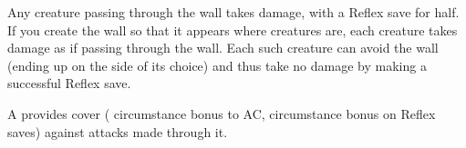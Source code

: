 \spellrng{\rngmed}
\begin{spelleffect}
  Any creature passing through the wall takes damage, with a Reflex save for half. If you create the wall so that it appears where creatures are, each creature takes damage as if passing through the wall. Each such creature can avoid the wall (ending up on the side of its choice) and thus take no damage by making a successful Reflex save.
  \par A  provides cover ( circumstance bonus to AC,  circumstance bonus on Reflex saves) against attacks made through it.
\end{spelleffect}

